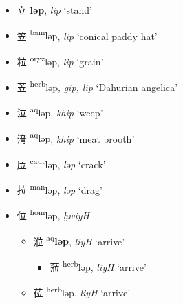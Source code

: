 \begin{itemize}

    \item {\Large{立}} %
    {\large{\textbf{ləp}}}, 
    \textit{lip} `stand' %

    \item {\Large{笠}} %
    {\large{\textsuperscript{bam}ləp}}, 
    \textit{lip} `conical paddy hat' %

    \item {\Large{粒}} %
    {\large{\textsuperscript{oryz}ləp}},
    \textit{lip} `grain' %

    \item {\Large{苙}} %
    {\large{\textsuperscript{herb}ləp}}, 
    \textit{gip, lip} `Dahurian angelica' %

    \item {\Large{泣}} %
    {\large{\textsuperscript{aq}ləp}}, 
    \textit{khip} `weep' %

    \item {\Large{湇}} %
    {\large{\textsuperscript{aq}ləp}}, 
    \textit{khip} `meat brooth' %

    \item {\Large{㕇}} %
    {\large{\textsuperscript{caut}ləp}},
    \textit{ləp} `crack' %

   \item {\Large{拉}} %
    {\large{\textsuperscript{man}ləp}},
    \textit{ləp} `drag' %


\item {\Large{位}}
 {\large{\textsuperscript{hom}ləp}},    
\textit{ḫwiyH}
\begin{itemize}
 
    \item {\Large{涖}} %
    {\large{\textsuperscript{aq}\textbf{ləp}}},
    \textit{liyH} `arrive' %

\begin{itemize}
    \item {\Large{蒞}} %
    {\large{\textsuperscript{herb}ləp}}, 
    \textit{liyH} `arrive' %
\end{itemize}


    \item {\Large{莅}} %
    {\large{\textsuperscript{herb}ləp}}, 
    \textit{liyH} `arrive' %

\end{itemize}
\end{itemize}

